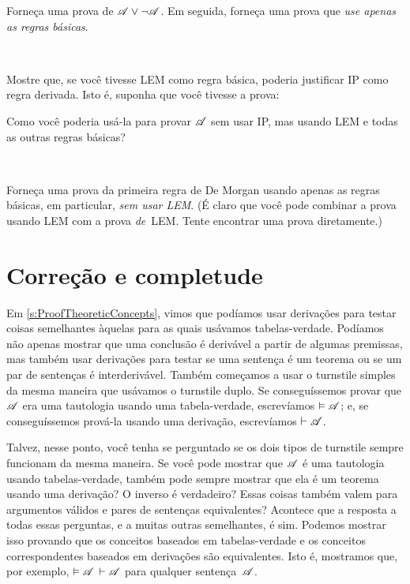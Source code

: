 \problempart
Forneça uma prova de $\mathscr{A} \vee \neg\mathscr{A}$. Em seguida,
forneça uma prova que \emph{use apenas as regras básicas}.

\

\problempart
Mostre que, se você tivesse LEM como regra básica, poderia justificar IP como regra derivada. Isto é, suponha que você tivesse a prova:
\begin{fitchproof}
  \open
  \AS
  \close
\end{fitchproof}
Como você poderia usá-la para provar $\mathscr{A}$ sem usar IP, mas usando LEM e todas as outras regras básicas?

\

\problempart
Forneça uma prova da primeira regra de De Morgan usando apenas as regras básicas, em particular, \emph{sem usar LEM}. (É claro que você pode combinar a prova usando LEM com a prova \emph{de}~LEM. Tente encontrar uma prova diretamente.)

\chapter{Correção e completude}
\label{sec:soundness_and_completeness}

Em \cref{s:ProofTheoreticConcepts}, vimos que podíamos usar
derivações para testar coisas semelhantes àquelas para as quais usávamos tabelas-verdade.
Podíamos não apenas mostrar que uma conclusão é derivável a partir de algumas
premissas, mas também usar derivações para testar se uma sentença é um teorema ou
se um par de sentenças é interderivável. Também começamos a usar o
turnstile simples da mesma maneira que usávamos o turnstile duplo. Se
conseguíssemos provar que $\mathscr{A}$ era uma tautologia usando uma tabela-verdade,
escrevíamos $\vDash \mathscr{A}$; e, se conseguíssemos prová-la usando uma
derivação, escrevíamos $\vdash \mathscr{A}$.

Talvez, nesse ponto, você tenha se perguntado se os dois tipos de turnstile
sempre funcionam da mesma maneira. Se você pode mostrar que $\mathscr{A}$ é uma
tautologia usando tabelas-verdade, também pode sempre mostrar que ela é um
teorema usando uma derivação? O inverso é verdadeiro? Essas coisas também
valem para argumentos válidos e pares de sentenças equivalentes? Acontece que
a resposta a todas essas perguntas, e a muitas outras semelhantes, é sim.
Podemos mostrar isso provando que os conceitos baseados em tabelas-verdade e
os conceitos correspondentes baseados em derivações são equivalentes. Isto é,
mostramos que, por exemplo, $\vDash \mathscr{A}$ \ifeff{}
$\vdash \mathscr{A}$ para qualquer sentença~$\mathscr{A}$.


